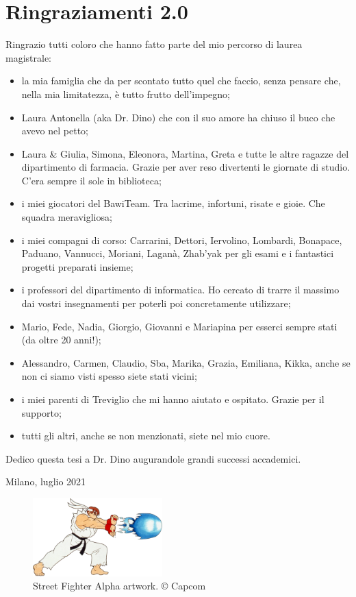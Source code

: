 %
%
\chapter*{Ringraziamenti 2.0}

Ringrazio tutti coloro che hanno fatto parte del mio percorso di laurea magistrale:
\begin{itemize}
	\item la mia famiglia che da per scontato tutto quel che faccio, senza pensare che, nella mia limitatezza, è tutto frutto dell'impegno;
	\item Laura Antonella (aka Dr. Dino) che con il suo amore ha chiuso il buco che avevo nel petto;
	\item Laura \& Giulia, Simona, Eleonora, Martina, Greta e tutte le altre ragazze del dipartimento di farmacia. Grazie per aver reso divertenti le giornate di studio. C'era sempre il sole in biblioteca;
	\item i miei giocatori del BawiTeam. Tra lacrime, infortuni, risate e gioie. Che squadra meravigliosa;
	\item i miei compagni di corso: Carrarini, Dettori, Iervolino, Lombardi, Bonapace, Paduano, Vannucci, Moriani, Laganà, Zhab'yak per gli esami e i fantastici progetti preparati insieme;
	\item i professori del dipartimento di informatica. Ho cercato di trarre il massimo dai vostri insegnamenti per poterli poi concretamente utilizzare;
	\item Mario, Fede, Nadia, Giorgio, Giovanni e Mariapina per esserci sempre stati (da oltre 20 anni!);
	\item Alessandro, Carmen, Claudio, Sba, Marika, Grazia, Emiliana, Kikka, anche se non ci siamo visti spesso siete stati vicini;	
	\item i miei parenti di Treviglio che mi hanno aiutato e ospitato. Grazie per il supporto;
	\item tutti gli altri, anche se non menzionati, siete nel mio cuore.
\end{itemize}

Dedico questa tesi a Dr. Dino augurandole grandi successi accademici.

\begin{flushright}
	Milano, luglio 2021
\end{flushright}

\vspace*{\fill}

\begin{figure}[H]
	\centering
	\includegraphics[width=5cm]{immagini/hadoken}
	\caption{Street Fighter Alpha artwork. © Capcom}
	\label{fig:hadoken}
\end{figure}